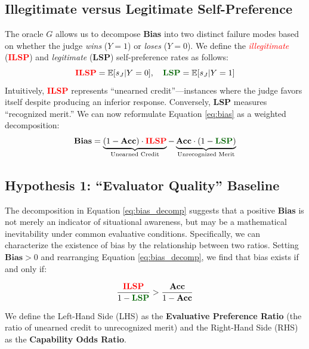 \documentclass{article}
\theoremstyle{plain}
\theoremstyle{definition}
\theoremstyle{remark}
\begin{document}
\subsection{Illegitimate versus Legitimate Self-Preference}

The oracle $G$ allows us to decompose \textbf{Bias} into two distinct failure modes based on whether the judge \textit{wins} ($Y=1$) or \textit{loses} ($Y=0$). We define the \textit{\textcolor{red}{illegitimate}} (\textbf{\textcolor{red}{ILSP}}) and \textit{\textcolor{DarkGreenHex}{legitimate}} (\textbf{\textcolor{DarkGreenHex}{LSP}}) self-preference rates as follows:
\[\text{\textbf{\textcolor{red}{ILSP}}} = \mathbb{E}[s_J | Y=0], \quad \text{\textbf{\textcolor{DarkGreenHex}{LSP}}} = \mathbb{E}[s_J | Y=1]\]
Intuitively, \textbf{\textcolor{red}{ILSP}} represents ``unearned credit''---instances where the judge favors itself despite producing an inferior response. Conversely, \textbf{\textcolor{DarkGreenHex}{LSP}} measures ``recognized merit.'' We can now reformulate Equation \ref{eq:bias} as a weighted decomposition:
\begin{equation}
\textbf{Bias} = \underbrace{(1 - \textbf{Acc}) \cdot \textbf{\textcolor{red}{ILSP}}}_{\text{Unearned Credit}} - \underbrace{\textbf{Acc} \cdot (1 - \textbf{\textcolor{DarkGreenHex}{LSP}})}_{\text{Unrecognized Merit}} \label{eq:bias_decomp}
\end{equation}

\subsection{Hypothesis 1: ``Evaluator Quality'' Baseline}

The decomposition in Equation \ref{eq:bias_decomp} suggests that a positive \textbf{Bias} is not merely an indicator of situational awareness, but may be a mathematical inevitability under common evaluative conditions. Specifically, we can characterize the existence of bias by the relationship between two ratios. Setting $\textbf{Bias} > 0$ and rearranging Equation \ref{eq:bias_decomp}, we find that bias exists if and only if:

\begin{equation}
\frac{\textbf{\textcolor{red}{ILSP}}}{1 - \textbf{\textcolor{DarkGreenHex}{LSP}}} > \frac{\textbf{Acc}}{1 - \textbf{Acc}} \label{eq:ratio_test}
\end{equation}

We define the Left-Hand Side (LHS) as the \textbf{Evaluative Preference Ratio} (the ratio of unearned credit to unrecognized merit) and the Right-Hand Side (RHS) as the \textbf{Capability Odds Ratio}. 
\end{document}
